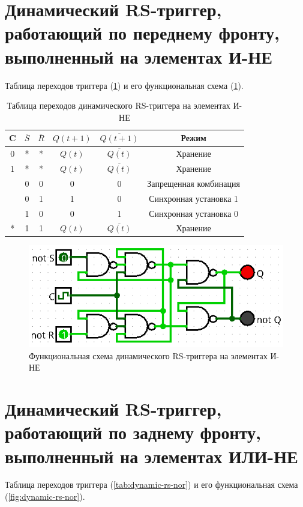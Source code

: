 \documentclass[14pt, a4paper]{extreport}
\newcommand\clockbt{%
	\begin{tikzpicture}[scale=0.25pt]
		\draw (0,0) -- (1,0) -- (1,1) -- (2,1);
	\end{tikzpicture}%
}
\begin{document}
\section{Динамический RS-триггер, работающий по переднему фронту, выполненный на элементах И-НЕ}
Таблица переходов триггера (\cref{tab:dynamic-rs-nand}) и его функциональная схема (\cref{fig:dynamic-rs-nand}).

\begin{table}[H]
	\caption{Таблица переходов динамического RS-триггера на элементах И-НЕ}
	\label{tab:dynamic-rs-nand}
	\begin{tabular}{|c|c|c|c|c|c|}
		\hline
		C & $\overline{S}$ & $\overline{R}$ & $Q(t + 1)$ & $\overline{Q(t + 1)}$ & Режим \\
		\hline
		0 & * & * & $Q(t)$ & $\overline{Q(t)}$ & Хранение \\
		\hline
		1 & * & * & $Q(t)$ & $\overline{Q(t)}$ & Хранение \\
		\hline
		\clockbt & 0 & 0 & 0 & 0 & Запрещенная комбинация \\
		\hline
		\clockbt & 0 & 1 & 1 & 0 & Синхронная установка 1 \\
		\hline
		\clockbt & 1 & 0 & 0 & 1 & Синхронная установка 0 \\
		\hline
		* & 1 & 1 & $Q(t)$ & $\overline{Q(t)}$ & Хранение \\
		\hline
	\end{tabular}
\end{table}

\begin{figure}[H]
	\caption{Функциональная схема динамического RS-триггера на элементах И-НЕ}
	\label{fig:dynamic-rs-nand}
	\includegraphics[width=\textwidth]{dynamic-rs-nand}
\end{figure}

\section{Динамический RS-триггер, работающий по заднему фронту, выполненный на элементах ИЛИ-НЕ}
Таблица переходов триггера (\cref{tab:dynamic-rs-nor}) и его функциональная схема (\cref{fig:dynamic-rs-nor}).
\end{document}
